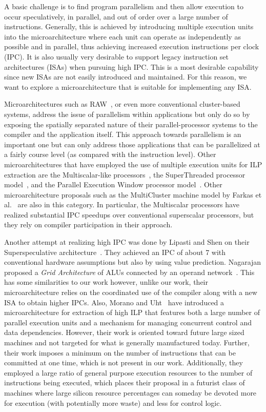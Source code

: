 \documentclass[10pt,dvips]{article}
\begin{document}
A basic challenge 
is to find program parallelism and then allow execution to occur
speculatively, in parallel, and out of order over 
a large number of instructions.
Generally, this is achieved by introducing multiple
execution units into the microarchitecture where each unit
can operate as independently as possible and in parallel, thus
achieving increased execution instructions per clock (IPC).
It is also usually very desirable to support legacy instruction
set architectures (ISAs) when pursuing high IPC. 
This is a most desirable capability since new ISAs are
not easily introduced and maintained.
For this reason, we want to explore a
microarchitecture that is suitable for implementing any ISA.

Microarchitectures such as RAW~\cite{waingold97,taylor02},
or even more conventional cluster-based systems,
address the issue of parallelism within applications but only do so
by exposing the spatially separated nature of their
parallel-processor systems to the compiler and the application itself.
This approach towards parallelism is an important one but
can only address those applications that can be parallelized at
a fairly course level (as compared with the instruction level).
Other microarchitectures that have employed the
use of multiple execution units for ILP extraction are the Multiscalar-like
processors~\cite{Sohi95,sundararaman97multiscalar},
the SuperThreaded processor model~\cite{tsai96superthread},
and
the Parallel Execution Window processor model~\cite{kemp96pew}.
Other microarchitecture proposals such as the MultiCluster machine
model by 
Farkas et al.~\cite{farkas97multicluster} are also in this category.
In particular, the Multiscalar processors have
realized substantial IPC speedups over conventional superscalar
processors, but they rely on compiler participation in their
approach.

Another attempt at realizing high IPC was done by
Lipasti and Shen on their Superspeculative
architecture~\cite{Lip97}.  They achieved an IPC of
about 7 with conventional hardware assumptions but
also by using value prediction.
Nagarajan proposed a {\em Grid Architecture} of ALUs
connected by an operand network~\cite{Nag01}.  
This has some similarities to our work
however, unlike our work, their microarchitecture
relies on the coordinated use of the compiler along with
a new ISA to obtain higher IPCs.
Also, Morano and Uht~\cite{morano02high,uht02realizing}
have introduced a microarchitecture for extraction of
high ILP that features both
a large number of parallel execution units and a 
mechanism for managing concurrent control and data dependencies.
However, their work is oriented toward future large sized machines
and not targeted for what is generally manufactured today.
Further, their work imposes a minimum on the number of instructions
that can be committed at one time, which is not present in our work.
Additionally, they employed a large ratio of general purpose
execution resources to the number of instructions being executed,
which places their proposal in a futurist class of machines
where large silicon resource percentages can someday be devoted more for
execution (with potentially more waste) and less for control logic.
\end{document}
